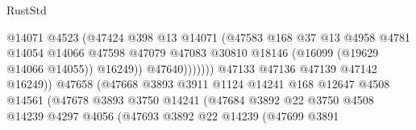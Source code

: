 \begin{lexlean}{RustStd}
\begin{coremodule}
                                                @14071
                                                @4523
                                                (@47424
                                                  @398
                                                  @13
                                                  @14071
                                                  (@47583
                                                    @168
                                                    @37
                                                    @13
                                                    @4958
                                                    @4781
                                                    @14054
                                                    @14066
                                                    @47598
                                                    @47079
                                                    @47083
                                                    @30810
                                                    @18146
                                                    (@16099 (@19629 @14066 @14055))
                                                    @16249))
                                                @47640)))))))
                                  @47133
                                  @47136
                                  @47139
                                  @47142
                                  @16249))
                              @47658
                              (@47668
                                @3893
                                @3911
                                @1124
                                @14241
                                @168
                                @12647
                                @4508
                                @14561
                                (@47678
                                  @3893
                                  @3750
                                  @14241
                                  (@47684
                                    @3892
                                    @22
                                    @3750
                                    @4508
                                    @14239
                                    @4297
                                    @4056
                                    (@47693
                                      @3892
                                      @22
                                      @14239
                                      (@47699
                                        @3891

\end{coremodule}
\end{lexlean}
